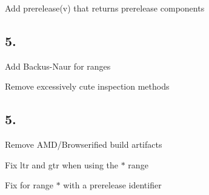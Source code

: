 \begin{DoxyItemize}
\item Add {\ttfamily prerelease(v)} that returns prerelease components
\end{DoxyItemize}

\subsection*{5.}


\begin{DoxyItemize}
\item Add Backus-\/\+Naur for ranges
\item Remove excessively cute inspection methods
\end{DoxyItemize}

\subsection*{5.}


\begin{DoxyItemize}
\item Remove A\+M\+D/\+Browserified build artifacts
\item Fix ltr and gtr when using the {\ttfamily $\ast$} range
\item Fix for range {\ttfamily $\ast$} with a prerelease identifier 
\end{DoxyItemize}